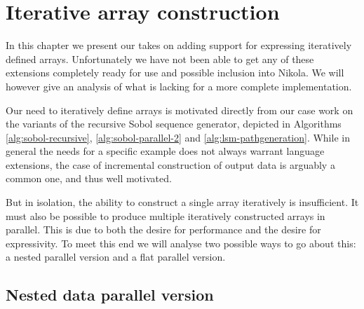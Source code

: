 \chapter{Iterative array construction}
\label{chap:unfold}


In this chapter we present our takes on adding support for expressing
iteratively defined arrays. Unfortunately we have not been able to get any of these
extensions completely ready for use and possible inclusion into Nikola.  We
will however give an analysis of what is lacking for a more complete
implementation.

Our need to iteratively define arrays is motivated directly from our case work
on the variants of the recursive Sobol sequence generator, depicted in
Algorithms \ref{alg:sobol-recursive}, \ref{alg:sobol-parallel-2} and
\ref{alg:lsm-pathgeneration}. While in general the needs for a specific example
does not always warrant language extensions, the case of incremental
construction of output data is arguably a common one, and thus well motivated.

But in isolation, the ability to construct a single array iteratively is
insufficient. It must also be possible to produce multiple iteratively
constructed arrays in parallel. This is due to both the desire for performance and
the desire for expressivity. To meet this end we will analyse two possible ways
to go about this: a nested parallel version and a flat parallel version.

\section{Nested data parallel version}


